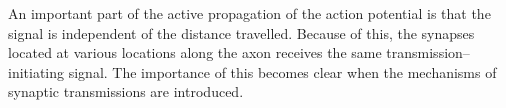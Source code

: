	
		An important part of the active propagation of the action potential is that the signal is independent of the distance travelled.
		Because of this, the synapses located at various locations along the axon receives the same transmission--initiating signal. %
		The importance of this becomes clear when the mechanisms of synaptic transmissions are introduced. %



% 	
% 
% 
% 
% 
% 	
% 
